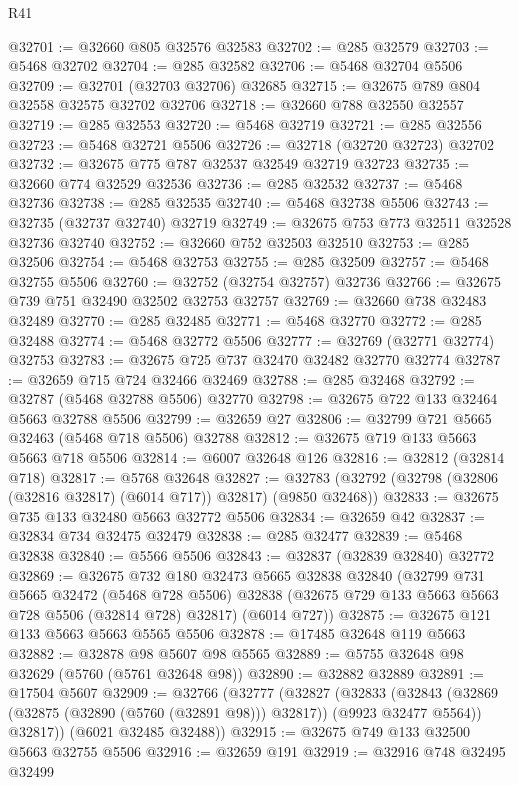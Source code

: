 \begin{lexlean}{R41}
\begin{coremodule}
@32701 := @32660 @805 @32576 @32583
@32702 := @285 @32579
@32703 := @5468 @32702
@32704 := @285 @32582
@32706 := @5468 @32704 @5506
@32709 := @32701 (@32703 @32706) @32685
@32715 := @32675 @789 @804 @32558 @32575 @32702 @32706
@32718 := @32660 @788 @32550 @32557
@32719 := @285 @32553
@32720 := @5468 @32719
@32721 := @285 @32556
@32723 := @5468 @32721 @5506
@32726 := @32718 (@32720 @32723) @32702
@32732 := @32675 @775 @787 @32537 @32549 @32719 @32723
@32735 := @32660 @774 @32529 @32536
@32736 := @285 @32532
@32737 := @5468 @32736
@32738 := @285 @32535
@32740 := @5468 @32738 @5506
@32743 := @32735 (@32737 @32740) @32719
@32749 := @32675 @753 @773 @32511 @32528 @32736 @32740
@32752 := @32660 @752 @32503 @32510
@32753 := @285 @32506
@32754 := @5468 @32753
@32755 := @285 @32509
@32757 := @5468 @32755 @5506
@32760 := @32752 (@32754 @32757) @32736
@32766 := @32675 @739 @751 @32490 @32502 @32753 @32757
@32769 := @32660 @738 @32483 @32489
@32770 := @285 @32485
@32771 := @5468 @32770
@32772 := @285 @32488
@32774 := @5468 @32772 @5506
@32777 := @32769 (@32771 @32774) @32753
@32783 := @32675 @725 @737 @32470 @32482 @32770 @32774
@32787 := @32659 @715 @724 @32466 @32469
@32788 := @285 @32468
@32792 := @32787 (@5468 @32788 @5506) @32770
@32798 := @32675 @722 @133 @32464 @5663 @32788 @5506
@32799 := @32659 @27
@32806 := @32799 @721 @5665 @32463 (@5468 @718 @5506) @32788
@32812 := @32675 @719 @133 @5663 @5663 @718 @5506
@32814 := @6007 @32648 @126
@32816 := @32812 (@32814 @718)
@32817 := @5768 @32648
@32827 := @32783 (@32792 (@32798 (@32806 (@32816 @32817) (@6014 @717)) @32817) (@9850 @32468))
@32833 := @32675 @735 @133 @32480 @5663 @32772 @5506
@32834 := @32659 @42
@32837 := @32834 @734 @32475 @32479
@32838 := @285 @32477
@32839 := @5468 @32838
@32840 := @5566 @5506
@32843 := @32837 (@32839 @32840) @32772
@32869 := @32675
    @732
    @180
    @32473
    @5665
    @32838
    @32840
    (@32799
      @731
      @5665
      @32472
      (@5468 @728 @5506)
      @32838
      (@32675 @729 @133 @5663 @5663 @728 @5506 (@32814 @728) @32817)
      (@6014 @727))
@32875 := @32675 @121 @133 @5663 @5663 @5565 @5506
@32878 := @17485 @32648 @119 @5663
@32882 := @32878 @98 @5607 @98 @5565
@32889 := @5755 @32648 @98 @32629 (@5760 (@5761 @32648 @98))
@32890 := @32882 @32889
@32891 := @17504 @5607
@32909 := @32766
    (@32777
      (@32827
        (@32833
          (@32843 (@32869 (@32875 (@32890 (@5760 (@32891 @98))) @32817)) (@9923 @32477 @5564))
          @32817))
      (@6021 @32485 @32488))
@32915 := @32675 @749 @133 @32500 @5663 @32755 @5506
@32916 := @32659 @191
@32919 := @32916 @748 @32495 @32499

\end{coremodule}
\end{lexlean}
